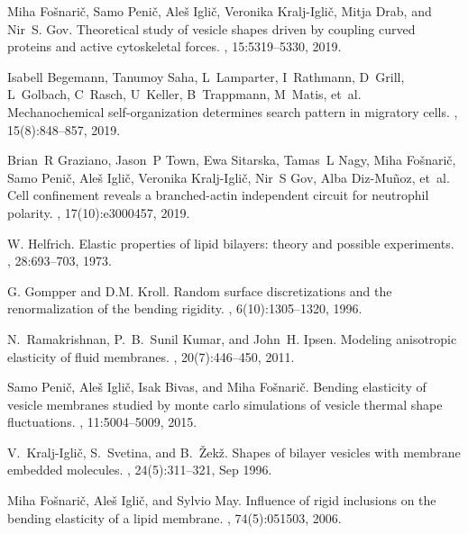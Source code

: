 \documentclass[pre,amsmath]{revtex4}
\begin{document}
\begin{thebibliography}{10}
Miha Fošnarič, Samo Penič, Aleš Iglič, Veronika Kralj-Iglič, Mitja Drab,
  and Nir~S. Gov.
\newblock Theoretical study of vesicle shapes driven by coupling curved
  proteins and active cytoskeletal forces.
, 15:5319--5330, 2019.

Isabell Begemann, Tanumoy Saha, L~Lamparter, I~Rathmann, D~Grill, L~Golbach,
  C~Rasch, U~Keller, B~Trappmann, M~Matis, et~al.
\newblock Mechanochemical self-organization determines search pattern in
  migratory cells.
, 15(8):848--857, 2019.

Brian~R Graziano, Jason~P Town, Ewa Sitarska, Tamas~L Nagy, Miha
  Fo{\v{s}}nari{\v{c}}, Samo Peni{\v{c}}, Ale{\v{s}} Igli{\v{c}}, Veronika
  Kralj-Igli{\v{c}}, Nir~S Gov, Alba Diz-Mu{\~n}oz, et~al.
\newblock Cell confinement reveals a branched-actin independent circuit for
  neutrophil polarity.
, 17(10):e3000457, 2019.

{W. Helfrich}.
\newblock Elastic properties of lipid bilayers: theory and possible
  experiments.
, 28:693--703, 1973.

{G. Gompper} and {D.M. Kroll}.
\newblock Random surface discretizations and the renormalization of the bending
  rigidity.
, 6(10):1305--1320, 1996.

N.~Ramakrishnan, P.~B.~Sunil Kumar, and John~H. Ipsen.
\newblock Modeling anisotropic elasticity of fluid membranes.
, 20(7):446--450, 2011.

Samo Penič, Aleš Iglič, Isak Bivas, and Miha Fošnarič.
\newblock Bending elasticity of vesicle membranes studied by monte carlo
  simulations of vesicle thermal shape fluctuations.
, 11:5004--5009, 2015.

V.~Kralj-Igli{\v{c}}, S.~Svetina, and B.~{\v{Z}}ek{\v{z}}.
\newblock Shapes of bilayer vesicles with membrane embedded molecules.
, 24(5):311--321, Sep 1996.

Miha Fo{\v{s}}nari{\v{c}}, Ale{\v{s}} Igli{\v{c}}, and Sylvio May.
\newblock Influence of rigid inclusions on the bending elasticity of a lipid
  membrane.
, 74(5):051503, 2006.


\end{thebibliography}
\end{document}
